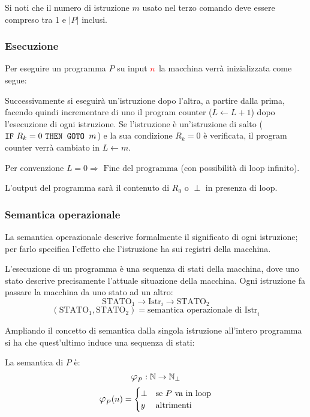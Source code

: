 Si noti che il numero di istruzione $m$ usato nel terzo comando deve essere compreso tra
1 e $|P|$ inclusi.

\subsubsection*{Esecuzione}
Per eseguire un programma $P$ su input $\color{red}n$ la macchina verrà inizializzata come segue:
\begin{figure}[H]
    \centering
    
\end{figure}

Successivamente si eseguirà un'istruzione dopo l'altra, a partire dalla prima, facendo quindi
incrementare di uno il program counter ($L\leftarrow L+1$) dopo l'esecuzione di ogni istruzione.
Se l'istruzione è un'istruzione di salto ($\texttt{IF}\text{ $R_k=0$ }\texttt{THEN GOTO }\text{$m$}$) e la sua condizione $R_k=0$
è verificata, il program counter verrà cambiato in $L\leftarrow m$.

Per convenzione $L=0 \Rightarrow \text{ Fine del programma}$ (con possibilità di loop infinito).

L'output del programma sarà il contenuto di $R_0$ o $\perp$ in presenza di loop.

\subsubsection*{Semantica operazionale}
La semantica operazionale descrive formalmente il significato di ogni istruzione; per farlo
specifica l'effetto che l'istruzione ha sui registri della macchina.

L'esecuzione di un programma è una sequenza di stati della macchina, dove uno stato descrive
precisamente l'attuale situazione della macchina. Ogni istruzione fa passare la macchina da
uno stato ad un altro:
$$ \text{STATO}_1 \rightarrow \boxed{\text{Istr}_i} \rightarrow \text{STATO}_2 $$
$$ (\text{STATO}_1,\text{STATO}_2) = \text{semantica operazionale di Istr}_i $$

Ampliando il concetto di semantica dalla singola istruzione all'intero programma si ha che 
quest'ultimo induce una sequenza di stati:
\begin{figure}[H]
    \centering
    
\end{figure}

La semantica di $P$ è:
$$ \semRAM_P:\N\to\N_\perp $$
$$ \semRAM_P(n) = \begin{cases}
\perp & \text{se $P$ va in loop}\\
y & \text{altrimenti}
\end{cases} $$

